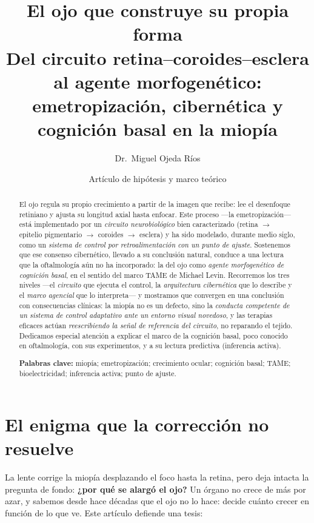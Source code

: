 \documentclass[11pt,a4paper]{article}
\title{\textbf{El ojo que construye su propia forma}\\[0.4em]
\large Del circuito retina--coroides--esclera al agente morfogenético:\\
emetropización, cibernética y cognición basal en la miopía}
\author{Dr.\ Miguel Ojeda Ríos}
\date{\small Artículo de hipótesis y marco teórico}
\begin{document}
\maketitle

\begin{abstract}
\noindent
El ojo regula su propio crecimiento a partir de la imagen que recibe: lee el desenfoque retiniano y ajusta su longitud axial hasta enfocar. Este proceso ---la emetropización--- está implementado por un \emph{circuito neurobiológico} bien caracterizado (retina $\rightarrow$ epitelio pigmentario $\rightarrow$ coroides $\rightarrow$ esclera) y ha sido modelado, durante medio siglo, como un \emph{sistema de control por retroalimentación con un punto de ajuste}. Sostenemos que ese consenso cibernético, llevado a su conclusión natural, conduce a una lectura que la oftalmología aún no ha incorporado: la del ojo como \emph{agente morfogenético de cognición basal}, en el sentido del marco TAME de Michael Levin. Recorremos los tres niveles ---el \emph{circuito} que ejecuta el control, la \emph{arquitectura cibernética} que lo describe y el \emph{marco agencial} que lo interpreta--- y mostramos que convergen en una conclusión con consecuencias clínicas: la miopía no es un defecto, sino la \emph{conducta competente de un sistema de control adaptativo ante un entorno visual novedoso}, y las terapias eficaces actúan \emph{reescribiendo la señal de referencia del circuito}, no reparando el tejido. Dedicamos especial atención a explicar el marco de la cognición basal, poco conocido en oftalmología, con sus experimentos, y a su lectura predictiva (inferencia activa).

\medskip
\noindent\textbf{Palabras clave:} miopía; emetropización; crecimiento ocular; cognición basal; TAME; bioelectricidad; inferencia activa; punto de ajuste.
\end{abstract}

\section{El enigma que la corrección no resuelve}

La lente corrige la miopía desplazando el foco hasta la retina, pero deja intacta la pregunta de fondo: \textbf{¿por qué se alargó el ojo?} Un órgano no crece de más por azar, y sabemos desde hace décadas que el ojo no lo hace: decide cuánto crecer en función de lo que ve. Este artículo defiende una tesis:
\end{document}
